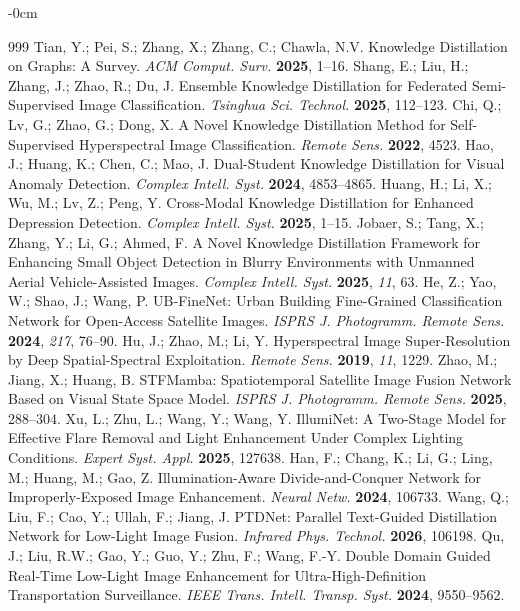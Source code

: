 \documentclass[sensors,article,submit,moreauthors]{Definitions/mdpi}
\begin{document}
\begin{adjustwidth}{-\extralength}{0cm}
\begin{thebibliography}{999}
 Tian, Y.; Pei, S.; Zhang, X.; Zhang, C.; Chawla, N.V. Knowledge Distillation on Graphs: A Survey. \textit{ACM Comput. Surv.} \textbf{2025}, 1--16.
 Shang, E.; Liu, H.; Zhang, J.; Zhao, R.; Du, J. Ensemble Knowledge Distillation for Federated Semi-Supervised Image Classification. \textit{Tsinghua Sci. Technol.} \textbf{2025}, 112--123.
 Chi, Q.; Lv, G.; Zhao, G.; Dong, X. A Novel Knowledge Distillation Method for Self-Supervised Hyperspectral Image Classification. \textit{Remote Sens.} \textbf{2022}, 4523.
 Hao, J.; Huang, K.; Chen, C.; Mao, J. Dual-Student Knowledge Distillation for Visual Anomaly Detection. \textit{Complex Intell. Syst.} \textbf{2024}, 4853--4865.
 Huang, H.; Li, X.; Wu, M.; Lv, Z.; Peng, Y. Cross-Modal Knowledge Distillation for Enhanced Depression Detection. \textit{Complex Intell. Syst.} \textbf{2025}, 1--15.
 Jobaer, S.; Tang, X.; Zhang, Y.; Li, G.; Ahmed, F. A Novel Knowledge Distillation Framework for Enhancing Small Object Detection in Blurry Environments with Unmanned Aerial Vehicle-Assisted Images. \textit{Complex Intell. Syst.} \textbf{2025}, \textit{11}, 63.
 He, Z.; Yao, W.; Shao, J.; Wang, P. UB-FineNet: Urban Building Fine-Grained Classification Network for Open-Access Satellite Images. \textit{ISPRS J. Photogramm. Remote Sens.} \textbf{2024}, \textit{217}, 76--90.
 Hu, J.; Zhao, M.; Li, Y. Hyperspectral Image Super-Resolution by Deep Spatial-Spectral Exploitation. \textit{Remote Sens.} \textbf{2019}, \textit{11}, 1229.
 Zhao, M.; Jiang, X.; Huang, B. STFMamba: Spatiotemporal Satellite Image Fusion Network Based on Visual State Space Model. \textit{ISPRS J. Photogramm. Remote Sens.} \textbf{2025}, 288--304.
 Xu, L.; Zhu, L.; Wang, Y.; Wang, Y. IllumiNet: A Two-Stage Model for Effective Flare Removal and Light Enhancement Under Complex Lighting Conditions. \textit{Expert Syst. Appl.} \textbf{2025}, 127638.
 Han, F.; Chang, K.; Li, G.; Ling, M.; Huang, M.; Gao, Z. Illumination-Aware Divide-and-Conquer Network for Improperly-Exposed Image Enhancement. \textit{Neural Netw.} \textbf{2024}, 106733.
 Wang, Q.; Liu, F.; Cao, Y.; Ullah, F.; Jiang, J. PTDNet: Parallel Text-Guided Distillation Network for Low-Light Image Fusion. \textit{Infrared Phys. Technol.} \textbf{2026}, 106198.
 Qu, J.; Liu, R.W.; Gao, Y.; Guo, Y.; Zhu, F.; Wang, F.-Y. Double Domain Guided Real-Time Low-Light Image Enhancement for Ultra-High-Definition Transportation Surveillance. \textit{IEEE Trans. Intell. Transp. Syst.} \textbf{2024}, 9550--9562.

\end{thebibliography}
\end{adjustwidth}
\end{document}

